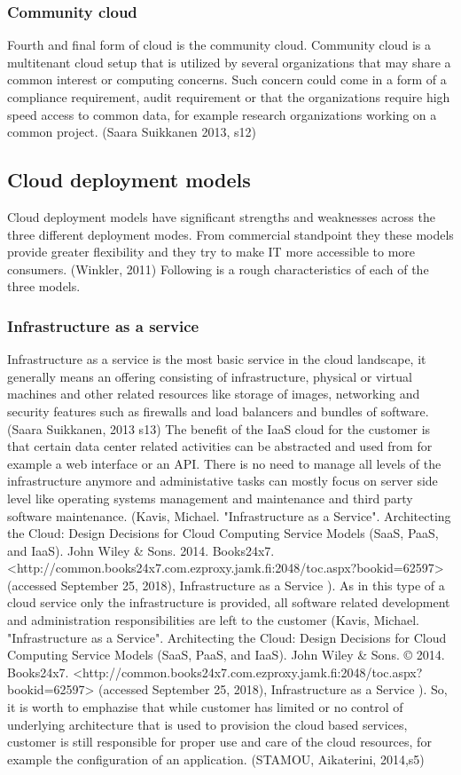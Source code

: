 \documentclass{article}
\begin{document}
\subsubsection{Community cloud}
Fourth and final form of cloud is the community cloud. Community cloud is a multitenant cloud setup that is utilized by several organizations that may share a common interest or computing concerns. Such concern could come in a form of a compliance requirement, audit requirement or that the organizations require high speed access to common data, for example research organizations working on a common project. (Saara Suikkanen 2013, s12)
\subsection{Cloud deployment models}
Cloud deployment models have significant strengths and weaknesses across the three different deployment modes. From commercial standpoint they these models provide greater flexibility and they try to make IT more accessible to more consumers. (Winkler, 2011) Following is a rough characteristics of each of the three models.
\subsubsection{Infrastructure as a service}
Infrastructure as a service is the most basic service in the cloud landscape, it generally means an offering consisting of infrastructure, physical or virtual machines and other related resources like storage of images, networking and security features such as firewalls and load balancers and bundles of software. (Saara Suikkanen, 2013 s13)
The benefit of the IaaS cloud for the customer is that certain data center related activities can be abstracted and used from for example a web interface or an API. There is no need to manage all levels of the infrastructure anymore and administative tasks can mostly focus on server side level like operating systems management and maintenance and third party software maintenance. (Kavis, Michael. "Infrastructure as a Service". Architecting the Cloud: Design Decisions for Cloud Computing Service Models (SaaS, PaaS, and IaaS). John Wiley \& Sons. 2014. Books24x7. <http://common.books24x7.com.ezproxy.jamk.fi:2048/toc.aspx?bookid=62597> (accessed September 25, 2018), Infrastructure as a Service ).
As in this type of a cloud service only the infrastructure is provided, all software related development and administration responsibilities are left to the customer (Kavis, Michael. "Infrastructure as a Service". Architecting the Cloud: Design Decisions for Cloud Computing Service Models (SaaS, PaaS, and IaaS). John Wiley \& Sons. © 2014. Books24x7. <http://common.books24x7.com.ezproxy.jamk.fi:2048/toc.aspx?bookid=62597> (accessed September 25, 2018), Infrastructure as a Service ).
So, it is worth to emphazise that while customer has limited or no control of underlying architecture that is used to provision the cloud based services, customer is still responsible for proper use and care of the cloud resources, for example the configuration of an application. (STAMOU, Aikaterini, 2014,s5)
\end{document}
